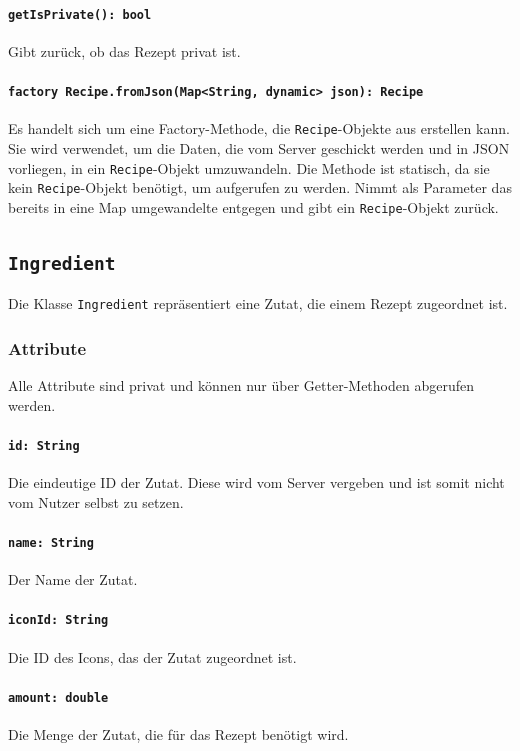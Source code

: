 \documentclass{entwurfsheft}
\begin{document}
\paragraph{\texttt{getIsPrivate(): bool}}
Gibt zurück, ob das Rezept privat ist.
\paragraph{\texttt{factory Recipe.fromJson(Map<String, dynamic> json): Recipe}}
Es handelt sich um eine Factory-Methode, die \texttt{Recipe}-Objekte aus  erstellen kann. Sie wird verwendet, um die Daten, die vom Server geschickt werden und in \Gls{JSON} vorliegen, in ein \texttt{Recipe}-Objekt umzuwandeln. Die Methode ist statisch, da sie kein \texttt{Recipe}-Objekt benötigt, um aufgerufen zu werden. Nimmt als Parameter das bereits in eine Map umgewandelte  entgegen und gibt ein \texttt{Recipe}-Objekt zurück.

\newpage
\subsection{\texttt{Ingredient}}\label{sec:ingredient}
Die Klasse \texttt{Ingredient} repräsentiert eine Zutat, die einem Rezept zugeordnet ist.
\subsubsection*{Attribute}
Alle Attribute sind privat und können nur über Getter-Methoden abgerufen werden.
\paragraph{\texttt{id: String}}
Die eindeutige ID der Zutat. Diese wird vom Server vergeben und ist somit nicht vom Nutzer selbst zu setzen.
\paragraph{\texttt{name: String}}
Der Name der Zutat.
\paragraph{\texttt{iconId: String}}
Die ID des Icons, das der Zutat zugeordnet ist.
\paragraph{\texttt{amount: double}}
Die Menge der Zutat, die für das Rezept benötigt wird.
\end{document}
